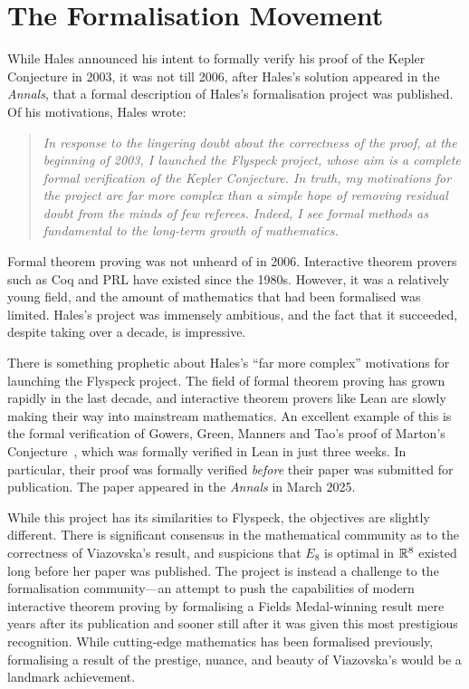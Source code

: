 \section{The Formalisation Movement}

While Hales announced his intent to formally verify his proof of the Kepler Conjecture in 2003, it was not till 2006, after Hales's solution appeared in the \textit{Annals}, that a formal description of Hales's formalisation project was published. Of his motivations, Hales wrote:
\begin{quote}
    \textit{In response to the lingering doubt about the correctness of the proof, at the beginning of 2003, I launched the \emph{Flyspeck} project, whose aim is a complete formal verification of the Kepler Conjecture. In truth, my motivations for the project are far more complex than a simple hope of removing residual doubt from the minds of few referees. Indeed, I see formal methods as fundamental to the long-term growth of mathematics.}~\cite{FlyspeckAnnouncement}
\end{quote}
Formal theorem proving was not unheard of in 2006. Interactive theorem provers such as Coq and PRL have existed since the 1980s. However, it was a relatively young field, and the amount of mathematics that had been formalised was limited. Hales's project was immensely ambitious, and the fact that it succeeded, despite taking over a decade, is impressive.

There is something prophetic about Hales's ``far more complex'' motivations for launching the Flyspeck project. The field of formal theorem proving has grown rapidly in the last decade, and interactive theorem provers like Lean are slowly making their way into mainstream mathematics. An excellent example of this is the formal verification of Gowers, Green, Manners and Tao's proof of Marton's Conjecture~\cite{PFRPublished}, which was formally verified in Lean in just three weeks. In particular, their proof was formally verified \textit{before} their paper was submitted for publication. The paper appeared in the \textit{Annals} in March 2025.

While this project has its similarities to Flyspeck, the objectives are slightly different. There is significant consensus in the mathematical community as to the correctness of Viazovska's result, and suspicions that $E_8$ is optimal in $\mathbb{R}^8$ existed long before her paper was published. The project is instead a challenge to the formalisation community---an attempt to push the capabilities of modern interactive theorem proving by formalising a Fields Medal-winning result mere years after its publication and sooner still after it was given this most prestigious recognition. While cutting-edge mathematics has been formalised \cite{liquidtensor} previously, formalising a result of the prestige, nuance, and beauty of Viazovska's would be a landmark achievement.

